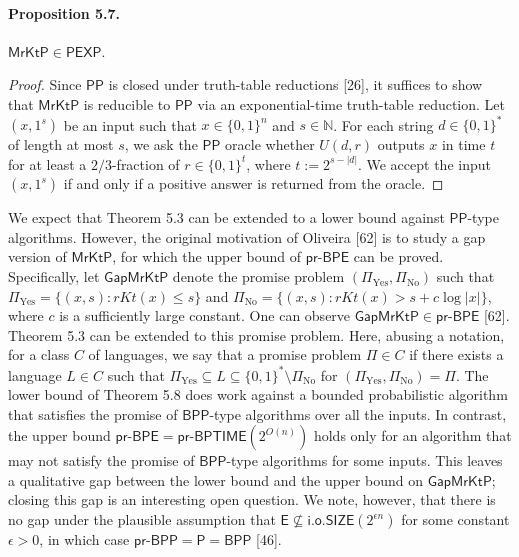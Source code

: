 \documentclass[10pt,a4paper]{article}
\begin{document}
\paragraph{Proposition 5.7.}
$\mathsf{MrKtP}\in\mathsf{PEXP}$.
\begin{proof}
Since $\mathsf{PP}$ is closed under truth-table reductions [26], it suffices to show that $\mathsf{MrKtP}$ is reducible to $\mathsf{PP}$ via an exponential-time truth-table reduction. Let $(x,1^s)$ be an input such that $x\in\{0,1\}^n$ and $s\in\mathbb N$. For each string $d\in\{0,1\}^*$ of length at most $s$, we ask the $\mathsf{PP}$ oracle whether $U(d,r)$ outputs $x$ in time $t$ for at least a $2/3$-fraction of $r\in\{0,1\}^t$, where $t:=2^{s-|d|}$. We accept the input $(x,1^s)$ if and only if a positive answer is returned from the oracle.
\end{proof}
We expect that Theorem 5.3 can be extended to a lower bound against $\mathsf{PP}$-type algorithms. However, the original motivation of Oliveira [62] is to study a gap version of $\mathsf{MrKtP}$, for which the upper bound of $\mathsf{pr\text{-}BPE}$ can be proved. Specifically, let $\mathsf{GapMrKtP}$ denote the promise problem $(\Pi_{\mathrm{Yes}},\Pi_{\mathrm{No}})$ such that $\Pi_{\mathrm{Yes}}=\{(x,s):rKt(x)\leq s\}$ and $\Pi_{\mathrm{No}}=\{(x,s):rKt(x)>s+c\log|x|\}$, where $c$ is a sufficiently large constant. One can observe $\mathsf{GapMrKtP}\in\mathsf{pr\text{-}BPE}$ [62]. Theorem 5.3 can be extended to this promise problem.
Here, abusing a notation, for a class $C$ of languages, we say that a promise problem $\Pi\in C$ if there exists a language $L\in C$ such that $\Pi_{\mathrm{Yes}}\subseteq L\subseteq\{0,1\}^*\setminus\Pi_{\mathrm{No}}$ for $(\Pi_{\mathrm{Yes}},\Pi_{\mathrm{No}})=\Pi$.
The lower bound of Theorem 5.8 does work against a bounded probabilistic algorithm that satisfies the promise of $\mathsf{BPP}$-type algorithms over all the inputs. In contrast, the upper bound $\mathsf{pr\text{-}BPE}=\mathsf{pr\text{-}BPTIME}(2^{O(n)})$ holds only for an algorithm that may not satisfy the promise of $\mathsf{BPP}$-type algorithms for some inputs. This leaves a qualitative gap between the lower bound and the upper bound on $\mathsf{GapMrKtP}$; closing this gap is an interesting open question. We note, however, that there is no gap under the plausible assumption that $\mathsf E\not\subseteq\mathsf{i.o.SIZE}(2^{\epsilon n})$ for some constant $\epsilon>0$, in which case $\mathsf{pr\text{-}BPP}=\mathsf P=\mathsf{BPP}$ [46].
\end{document}

